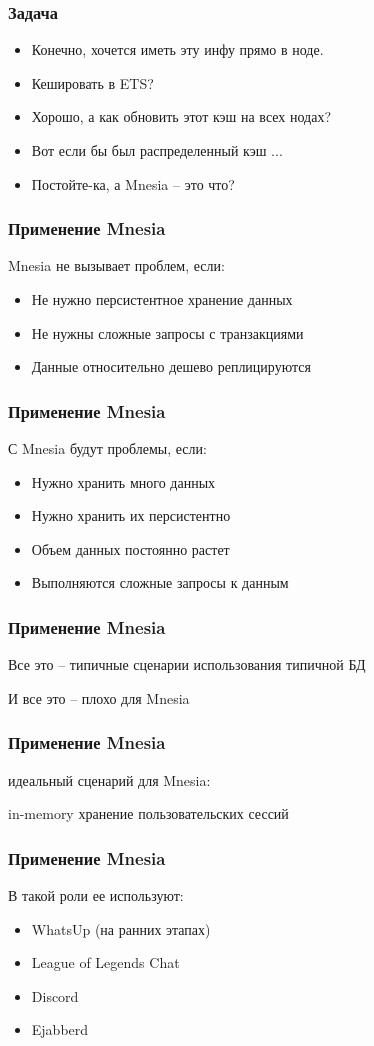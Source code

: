 \documentclass[10pt]{beamer}
\begin{document}
\begin{frame}
\frametitle{Задача}
\begin{itemize}[<+->]
\item Конечно, хочется иметь эту инфу прямо в ноде.
\item Кешировать в ETS?
\item Хорошо, а как обновить этот кэш на всех нодах?
\item Вот если бы был распределенный кэш ...
\item Постойте-ка, а Mnesia -- это что?
\end{itemize}
\end{frame}

\begin{frame}
\frametitle{Применение Mnesia}
Mnesia не вызывает проблем, если:
\begin{itemize}
\item Не нужно персистентное хранение данных
\item Не нужны сложные запросы с транзакциями
\item Данные относительно дешево реплицируются
\end{itemize}
\end{frame}

\begin{frame}
\frametitle{Применение Mnesia}
С Mnesia будут проблемы, если:
\begin{itemize}
\item Нужно хранить много данных
\item Нужно хранить их персистентно
\item Объем данных постоянно растет
\item Выполняются сложные запросы к данным
\end{itemize}
\end{frame}

\begin{frame}
\frametitle{Применение Mnesia}
\centering
Все это -- типичные сценарии использования типичной БД
\par \bigskip
И все это -- плохо для Mnesia
\end{frame}

\begin{frame}
\frametitle{Применение Mnesia}
\centering
идеальный сценарий для Mnesia:
\par \bigskip
in-memory хранение пользовательских сессий
\end{frame}

\begin{frame}
\frametitle{Применение Mnesia}
\centering
В такой роли ее используют:
\begin{itemize}
\item WhatsUp (на ранних этапах)
\item League of Legends Chat
\item Discord
\item Ejabberd
\end{itemize}
\end{frame}
\end{document}
